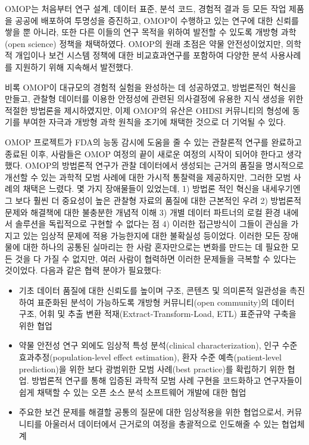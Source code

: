 \documentclass[11pt]{book}
\providecommand{\tightlist}{%
  \setlength{\itemsep}{0pt}\setlength{\parskip}{0pt}}
\theoremstyle{definition}
\theoremstyle{definition}
\theoremstyle{definition}
\theoremstyle{remark}
\begin{document}
OMOP는 처음부터 연구 설계, 데이터 표준, 분석 코드, 경험적 결과 등 모든
작업 제품을 공공에 배포하여 투명성을 증진하고, OMOP이 수행하고 있는
연구에 대한 신뢰를 쌓을 뿐 아니라, 또한 다른 이들의 연구 목적을 위하여
발전할 수 있도록 개방형 과학(open science) 정책을 채택하였다. OMOP의
원래 초점은 약물 안전성이었지만, 의학적 개입이나 보건 시스템 정책에 대한
비교효과연구를 포함하여 다양한 분석 사용사례를 지원하기 위해 지속해서
발전했다.

비록 OMOP이 대규모의 경험적 실험을 완성하는 데 성공하였고,
\citep{ryan2012omop, ryan2013omop} 방법론적인 혁신을 만들고,
\citep{schuemie_2014} 관찰형 데이터를 이용한 안정성에 관련된 의사결정에
유용한 지식 생성을 위한 적절한 방법론을 제시하였지만,
\citep{madigan_2013, madigan2013design} 이제 OMOP의 유산은 OHDSI
커뮤니티의 형성에 동기를 부여한 자극과 개방형 과학 원칙을 조기에 채택한
것으로 더 기억될 수 있다.

OMOP 프로젝트가 FDA의 능동 감시에 도움을 줄 수 있는 관찰론적 연구를
완료하고 종료된 이후, 사람들은 OMOP 여정의 끝이 새로운 여정의 시작이
되어야 한다고 생각했다. OMOP의 방법론적 연구가 관찰 데이터에서 생성되는
근거의 품질을 명시적으로 개선할 수 있는 과학적 모범 사례에 대한 가시적
통찰력을 제공하지만, 그러한 모범 사례의 채택은 느렸다. 몇 가지
장애물들이 있었는데, 1) 방법론 적인 혁신을 내세우기엔 그 보다 훨씬 더
중요성이 높은 관찰형 자료의 품질에 대한 근본적인 우려 2) 방법론적 문제와
해결책에 대한 불충분한 개념적 이해 3) 개별 데이터 파트너의 로컬 환경
내에서 솔루션을 독립적으로 구현할 수 없다는 점 4) 이러한 접근방식이
그들이 관심을 가지고 있는 임상적 문제에 적용 가능한지에 대한 불확실성
등이었다. 이러한 모든 장애물에 대한 하나의 공통된 실마리는 한 사람
혼자만으로는 변화를 만드는 데 필요한 모든 것을 다 가질 수 없지만, 여러
사람이 협력하면 이러한 문제들을 극복할 수 있다는 것이었다. 다음과 같은
협력 분야가 필요했다:

\begin{itemize}
\tightlist
\item
  기초 데이터 품질에 대한 신뢰도를 높이며 구조, 콘텐츠 및 의미론적
  일관성을 촉진하여 표준화된 분석이 가능하도록 개방형 커뮤니티(open
  community)의 데이터 구조, 어휘 및 추출 변환
  적재(Extract-Transform-Load, ETL) 표준규약 구축을 위한 협업
\item
  약물 안전성 연구 외에도 임상적 특성 분석(clinical characterization),
  인구 수준 효과추정(population-level effect estimation), 환자 수준
  예측(patient-level prediction)을 위한 보다 광범위한 모범 사례(best
  practice)를 확립하기 위한 협업. 방법론적 연구를 통해 입증된 과학적
  모범 사례 구현을 코드화하고 연구자들이 쉽게 채택할 수 있는 오픈 소스
  분석 소프트웨어 개발에 대한 협업
\item
  주요한 보건 문제를 해결할 공통의 질문에 대한 임상적용을 위한
  협업으로서, 커뮤니티를 아울러서 데이터에서 근거로의 여정을 총괄적으로
  인도해줄 수 있는 협업체계
\end{itemize}
\end{document}
